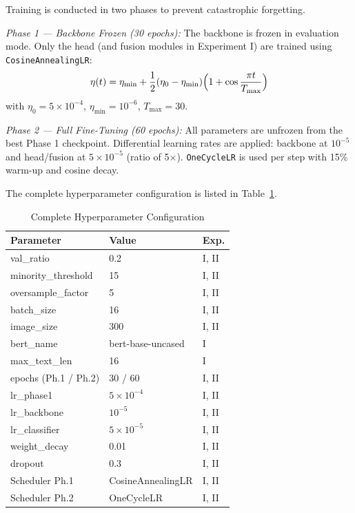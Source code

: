 \documentclass[conference]{IEEEtran}
\begin{document}
Training is conducted in two phases to prevent catastrophic forgetting.

\textit{Phase 1 — Backbone Frozen (30 epochs):} The backbone is frozen 
in evaluation mode. Only the head (and fusion modules in Experiment I) 
are trained using \texttt{CosineAnnealingLR}:
\begin{equation}
  \eta(t) = \eta_{\min} + \frac{1}{2}(\eta_0 - \eta_{\min})
  \Bigl(1 + \cos\frac{\pi t}{T_{\max}}\Bigr)
  \label{eq:cosine}
\end{equation}
with $\eta_0 = 5{\times}10^{-4}$, $\eta_{\min} = 10^{-6}$, 
$T_{\max} = 30$.

\textit{Phase 2 — Full Fine-Tuning (60 epochs):} All parameters are 
unfrozen from the best Phase 1 checkpoint. Differential learning rates 
are applied: backbone at $10^{-5}$ and head/fusion at $5{\times}10^{-5}$ 
(ratio of 5$\times$). \texttt{OneCycleLR} is used per step with 15\% 
warm-up and cosine decay.

The complete hyperparameter configuration is listed in 
Table~\ref{tab:hyperparam}.

\begin{table}[!t]
\caption{Complete Hyperparameter Configuration}
\label{tab:hyperparam}
\begin{center}
\small
\begin{tabular}{lll}
\hline
\textbf{Parameter} & \textbf{Value} & \textbf{Exp.} \\
\hline
val\_ratio              & 0.2                & I, II \\
minority\_threshold     & 15                 & I, II \\
oversample\_factor      & 5                  & I, II \\
batch\_size             & 16                 & I, II \\
image\_size             & 300                & I, II \\
bert\_name              & bert-base-uncased  & I \\
max\_text\_len          & 16                 & I \\
epochs (Ph.1 / Ph.2)    & 30 / 60            & I, II \\
lr\_phase1              & $5\times10^{-4}$   & I, II \\
lr\_backbone            & $10^{-5}$          & I, II \\
lr\_classifier          & $5\times10^{-5}$   & I, II \\
weight\_decay           & 0.01               & I, II \\
dropout                 & 0.3                & I, II \\
Scheduler Ph.1          & CosineAnnealingLR  & I, II \\
Scheduler Ph.2          & OneCycleLR         & I, II \\
\hline
\end{tabular}
\end{center}
\end{table}
\end{document}
